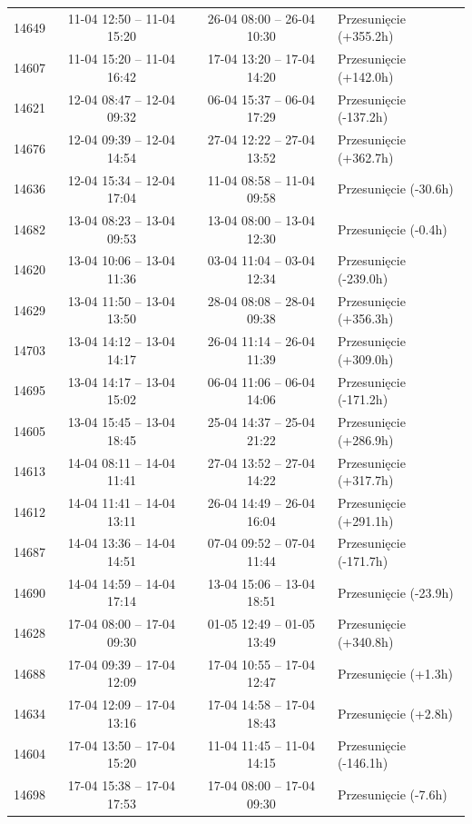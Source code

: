 \begin{table}[htbp]
\begin{tabular}{|r|c|c|l|}
14649 & 11-04 12:50 -- 11-04 15:20 & 26-04 08:00 -- 26-04 10:30 & Przesunięcie (+355.2h) \\ 
14607 & 11-04 15:20 -- 11-04 16:42 & 17-04 13:20 -- 17-04 14:20 & Przesunięcie (+142.0h) \\ 
14621 & 12-04 08:47 -- 12-04 09:32 & 06-04 15:37 -- 06-04 17:29 & Przesunięcie (-137.2h) \\ 
14676 & 12-04 09:39 -- 12-04 14:54 & 27-04 12:22 -- 27-04 13:52 & Przesunięcie (+362.7h) \\ 
14636 & 12-04 15:34 -- 12-04 17:04 & 11-04 08:58 -- 11-04 09:58 & Przesunięcie (-30.6h) \\ 
14682 & 13-04 08:23 -- 13-04 09:53 & 13-04 08:00 -- 13-04 12:30 & Przesunięcie (-0.4h) \\ 
14620 & 13-04 10:06 -- 13-04 11:36 & 03-04 11:04 -- 03-04 12:34 & Przesunięcie (-239.0h) \\ 
14629 & 13-04 11:50 -- 13-04 13:50 & 28-04 08:08 -- 28-04 09:38 & Przesunięcie (+356.3h) \\ 
14703 & 13-04 14:12 -- 13-04 14:17 & 26-04 11:14 -- 26-04 11:39 & Przesunięcie (+309.0h) \\ 
14695 & 13-04 14:17 -- 13-04 15:02 & 06-04 11:06 -- 06-04 14:06 & Przesunięcie (-171.2h) \\ 
14605 & 13-04 15:45 -- 13-04 18:45 & 25-04 14:37 -- 25-04 21:22 & Przesunięcie (+286.9h) \\ 
14613 & 14-04 08:11 -- 14-04 11:41 & 27-04 13:52 -- 27-04 14:22 & Przesunięcie (+317.7h) \\ 
14612 & 14-04 11:41 -- 14-04 13:11 & 26-04 14:49 -- 26-04 16:04 & Przesunięcie (+291.1h) \\ 
14687 & 14-04 13:36 -- 14-04 14:51 & 07-04 09:52 -- 07-04 11:44 & Przesunięcie (-171.7h) \\ 
14690 & 14-04 14:59 -- 14-04 17:14 & 13-04 15:06 -- 13-04 18:51 & Przesunięcie (-23.9h) \\ 
14628 & 17-04 08:00 -- 17-04 09:30 & 01-05 12:49 -- 01-05 13:49 & Przesunięcie (+340.8h) \\ 
14688 & 17-04 09:39 -- 17-04 12:09 & 17-04 10:55 -- 17-04 12:47 & Przesunięcie (+1.3h) \\ 
14634 & 17-04 12:09 -- 17-04 13:16 & 17-04 14:58 -- 17-04 18:43 & Przesunięcie (+2.8h) \\ 
14604 & 17-04 13:50 -- 17-04 15:20 & 11-04 11:45 -- 11-04 14:15 & Przesunięcie (-146.1h) \\ 
14698 & 17-04 15:38 -- 17-04 17:53 & 17-04 08:00 -- 17-04 09:30 & Przesunięcie (-7.6h) \\ 

\end{tabular}
\end{table}
